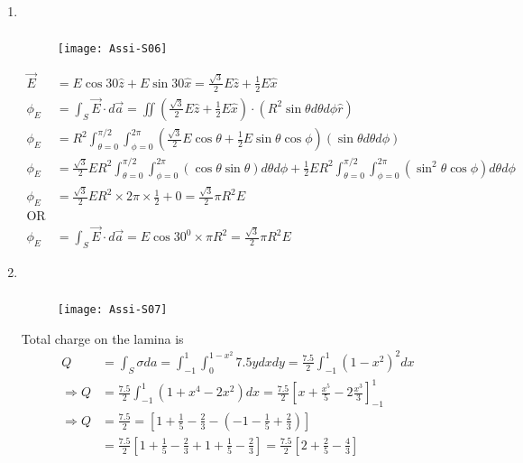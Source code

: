\begin{enumerate}
\begin{answer}
\end{answer}
\item $\left. \right. $
\begin{answer}$\left. \right. $
		\begin{figure}[H]
		\centering
		\texttt{[image: Assi-S06]}
	\end{figure}
	\begin{align*}
\vec{E}&=E \cos 30 \hat{z}+E \sin 30 \hat{x}=\frac{\sqrt{3}}{2} E \hat{z}+\frac{1}{2} E \hat{x}\\
	\phi_{E}&=\int_{S} \vec{E} \cdot d \vec{a}=\iint\left(\frac{\sqrt{3}}{2} E \hat{z}+\frac{1}{2} E \hat{x}\right) \cdot\left(R^{2} \sin \theta d \theta d \phi \hat{r}\right) \\
	\phi_{E}&=R^{2} \int_{\theta=0}^{\pi / 2} \int_{\phi=0}^{2 \pi}\left(\frac{\sqrt{3}}{2} E \cos \theta+\frac{1}{2} E \sin \theta \cos \phi\right)(\sin \theta d \theta d \phi) \\
	\phi_{E}&=\frac{\sqrt{3}}{2} E R^{2} \int_{\theta=0}^{\pi / 2} \int_{\phi=0}^{2 \pi}(\cos \theta \sin \theta) d \theta d \phi+\frac{1}{2} E R^{2} \int_{\theta=0}^{\pi / 2} \int_{\phi=0}^{2 \pi}\left(\sin ^{2} \theta \cos \phi\right) d \theta d \phi \\
	\phi_{E}&=\frac{\sqrt{3}}{2} E R^{2} \times 2 \pi \times \frac{1}{2}+0=\frac{\sqrt{3}}{2} \pi R^{2} E \\
	\mathrm{OR} \\
	\phi_{E}&=\int_{S} \vec{E} \cdot d \vec{a}=E \cos 30^{0} \times \pi R^{2}=\frac{\sqrt{3}}{2} \pi R^{2} E
	\end{align*}
\end{answer}
\item $\left. \right. $
\begin{answer}$\left. \right. $
		\begin{figure}[H]
		\centering
		\texttt{[image: Assi-S07]}
	\end{figure}
	Total charge on the lamina is
	\begin{align*}
	Q&=\int_{S} \sigma d a=\int_{-1}^{1} \int_{0}^{1-x^{2}} 7.5 y d x d y=\frac{7.5}{2} \int_{-1}^{1}\left(1-x^{2}\right)^{2} d x \\
	\Rightarrow Q&=\frac{7.5}{2} \int_{-1}^{1}\left(1+x^{4}-2 x^{2}\right) d x=\frac{7.5}{2}\left[x+\frac{x^{5}}{5}-2 \frac{x^{3}}{3}\right]_{-1}^{1}\\
	\Rightarrow Q&=\frac{7.5}{2}=\left[1+\frac{1}{5}-\frac{2}{3}-\left(-1-\frac{1}{5}+\frac{2}{3}\right)\right]\\&=\frac{7.5}{2}\left[1+\frac{1}{5}-\frac{2}{3}+1+\frac{1}{5}-\frac{2}{3}\right]=\frac{7.5}{2}\left[2+\frac{2}{5}-\frac{4}{3}\right]\\

\end{align*}
\end{answer}
\end{enumerate}
